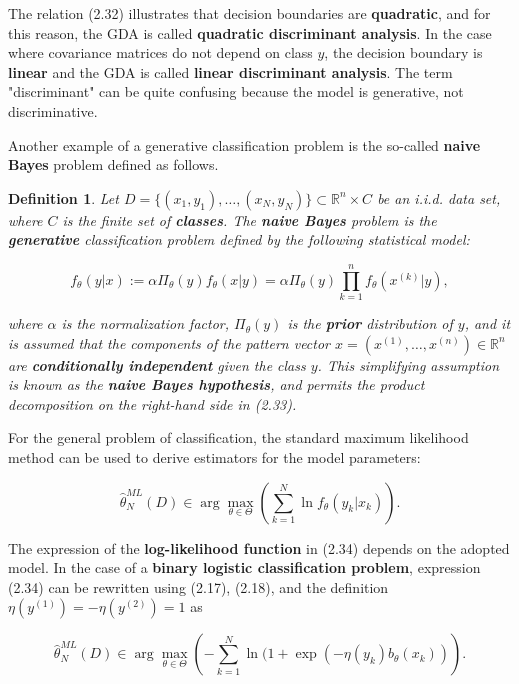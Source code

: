 \documentclass{report}
\newtheorem{definition}{Definition}[chapter]
\begin{document}
The relation (2.32) illustrates that decision boundaries are \textbf{quadratic}, and for this reason, the GDA is called \textbf{quadratic discriminant analysis}. In the case where covariance matrices do not depend on class $y$, the decision boundary is \textbf{linear} and the GDA is called \textbf{linear discriminant analysis}. The term "discriminant" can be quite confusing because the model is generative, not discriminative.

Another example of a generative classification problem is the so-called \textbf{naive Bayes} problem defined as follows.

\begin{definition}
Let $D = \{(x_1,y_1),\dots,(x_N,y_N)\} \subset \mathbb{R}^n \times C$ be an i.i.d. data set, where $C$ is the finite set of \textbf{classes}. The \textbf{naive Bayes} problem is the \textbf{generative} classification problem defined by the following statistical model:

\begin{equation}
f_\theta(y|x) := \alpha \Pi_\theta(y) f_\theta(x|y) = \alpha \Pi_\theta(y) \prod_{k=1}^n f_\theta(x^{(k)}|y),
\end{equation}

where $\alpha$ is the normalization factor, $\Pi_\theta(y)$ is the \textbf{prior} distribution of $y$, and it is assumed that the components of the pattern vector $x = (x^{(1)},\dots,x^{(n)}) \in \mathbb{R}^n$ are \textbf{conditionally independent} given the class $y$. This simplifying assumption is known as the \textbf{naive Bayes hypothesis}, and permits the product decomposition on the right-hand side in (2.33).
\end{definition}

For the general problem of classification, the standard maximum likelihood method can be used to derive estimators for the model parameters:

\begin{equation}
\hat{\theta}^{ML}_N(D) \in \arg \max_{\theta \in \Theta} \left(\sum_{k=1}^N \ln f_\theta(y_k|x_k)\right).
\end{equation}

The expression of the \textbf{log-likelihood function} in (2.34) depends on the adopted model. In the case of a \textbf{binary logistic classification problem}, expression (2.34) can be rewritten using (2.17), (2.18), and the definition $\eta(y^{(1)}) = -\eta(y^{(2)}) = 1$ as

\begin{equation}
\hat{\theta}^{ML}_N(D) \in \arg \max_{\theta \in \Theta} \left(-\sum_{k=1}^N \ln(1+\exp(-\eta(y_k)b_\theta(x_k))\right).
\end{equation}
\end{document}
